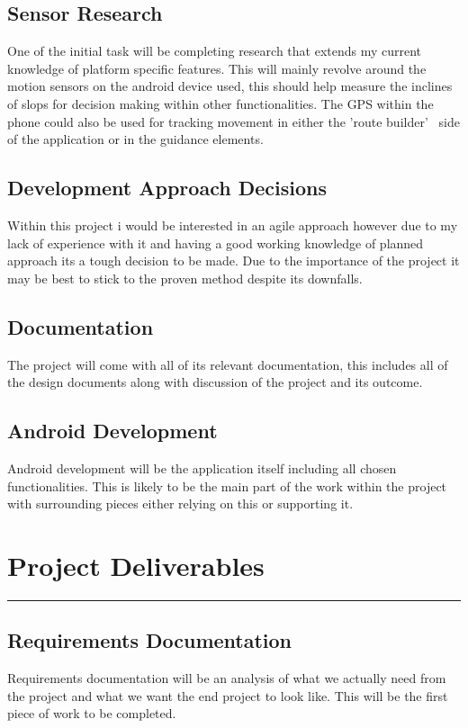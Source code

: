 \documentclass[10pt,a4paper]{article}
\begin{document}
\subsection{Sensor Research}
One of the initial task will be completing research that extends my current knowledge of platform specific features. This will mainly revolve around the motion sensors on the android device used, this should help measure the inclines of slops for decision making within other functionalities. The GPS within the phone could also be used for tracking movement in either the 'route builder'~\cite{chang2013} side of the application or in the guidance elements.
\subsection{Development Approach Decisions}
Within this project i would be interested in an agile approach however due to my lack of experience with it and having a good working knowledge of planned approach its a tough decision to be made. Due to the importance of the project it may be best to stick to the proven method despite its downfalls. 
\subsection{Documentation}
The project will come with all of its relevant documentation, this includes all of the design documents along with discussion of the project and its outcome.
\subsection{Android Development}
Android development will be the application itself including all chosen functionalities. This is likely to be the main part of the work within the project with surrounding pieces either relying on this or supporting it. 
\vspace{0.4cm}
\section{Project Deliverables}
\vspace{0.2cm}
\hrule
\vspace{0.4cm}
\subsection{Requirements Documentation}
Requirements documentation will be an analysis of what we actually need from the project and what we want the end project to look like. This will be the first piece of work to be completed. 
\end{document}
